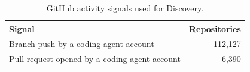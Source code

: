 \begin{table}[H]
  \centering
  \small
  \setlength{\tabcolsep}{10pt}
  \renewcommand{\arraystretch}{1.15}
  \caption{GitHub activity signals used for Discovery.}
  \label{tab:perfrace-discovery-statistics}
  \begin{tabular}{@{}lr@{}}
    \toprule
    Signal & Repositories \\
    \midrule
    Branch push by a coding-agent account & 112,127 \\
    Pull request opened by a coding-agent account & 6,390 \\
    \bottomrule
  \end{tabular}
\end{table}
